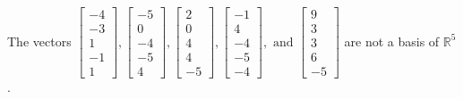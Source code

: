 \begin{exercise}
\begin{exerciseStatement}
  \end{exerciseStatement}
  \begin{exerciseAnswer}
   The vectors \(\left[\begin{array}{r}
-4 \\
-3 \\
1 \\
-1 \\
1
\end{array}\right] , \left[\begin{array}{r}
-5 \\
0 \\
-4 \\
-5 \\
4
\end{array}\right] , \left[\begin{array}{r}
2 \\
0 \\
4 \\
4 \\
-5
\end{array}\right] , \left[\begin{array}{r}
-1 \\
4 \\
-4 \\
-5 \\
-4
\end{array}\right] , \text{ and } \left[\begin{array}{r}
9 \\
3 \\
3 \\
6 \\
-5
\end{array}\right]\) 
  	 are not  a basis of \(\mathbb{R}^5\).
  


  \end{exerciseAnswer}
\end{exercise}